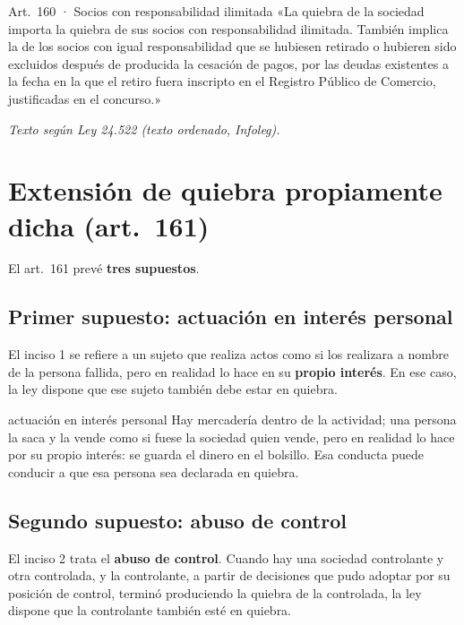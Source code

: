 \documentclass[12pt,oneside]{book}
\begin{document}
\begin{norma}{Art.~160 · Socios con responsabilidad ilimitada}
«La quiebra de la sociedad importa la quiebra de sus socios con responsabilidad ilimitada. También implica la de los socios con igual responsabilidad que se hubiesen retirado o hubieren sido excluidos después de producida la cesación de pagos, por las deudas existentes a la fecha en la que el retiro fuera inscripto en el Registro Público de Comercio, justificadas en el concurso.»

\par\smallskip\textit{Texto según Ley 24.522 (texto ordenado, Infoleg).}
\end{norma}

\section{Extensión de quiebra propiamente dicha (art.~161)}

El art.~161 prevé \textbf{tres supuestos}.

\subsection{Primer supuesto: actuación en interés personal}

El inciso 1 se refiere a un sujeto que realiza actos como si los realizara a nombre de la persona fallida, pero en realidad lo hace en su \textbf{propio interés}. En ese caso, la ley dispone que ese sujeto también debe estar en quiebra.

\begin{example}{actuación en interés personal}
Hay mercadería dentro de la actividad; una persona la saca y la vende como si fuese la sociedad quien vende, pero en realidad lo hace por su propio interés: se guarda el dinero en el bolsillo. Esa conducta puede conducir a que esa persona sea declarada en quiebra.
\end{example}

\subsection{Segundo supuesto: abuso de control}

El inciso 2 trata el \textbf{abuso de control}. Cuando hay una sociedad controlante y otra controlada, y la controlante, a partir de decisiones que pudo adoptar por su posición de control, terminó produciendo la quiebra de la controlada, la ley dispone que la controlante también esté en quiebra.
\end{document}
